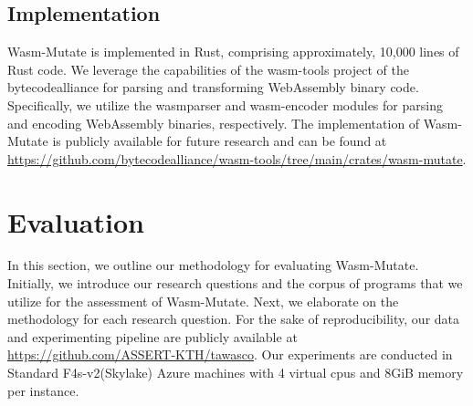\documentclass[a4paper,fleqn]{cas-dc}
\newcommand{\tool}{{\sc Wasm-Mutate}\xspace}
\newcommand{\Wasm}{WebAssembly\xspace}
\newcommand{\repourl}{\url{https://github.com/bytecodealliance/wasm-tools/tree/main/crates/wasm-mutate}}
\newcommand{\dataurl}{\url{https://github.com/ASSERT-KTH/tawasco}}
\begin{document}
\subsection{Implementation}

\tool is implemented in Rust, comprising approximately, 10,000 lines of Rust code. 
We leverage the capabilities of the wasm-tools project of the bytecodealliance for parsing and transforming WebAssembly binary code. 
Specifically, we utilize the wasmparser and wasm-encoder modules for parsing and encoding WebAssembly binaries, respectively.
The implementation of \tool is publicly available for future research and can be found at \repourl.





\section {Evaluation}
\label{eval}

In this section, we outline our methodology for evaluating \tool.
Initially, we introduce our research questions and the corpus of programs that we utilize for the assessment of \tool.
Next, we elaborate on the methodology for each research question.
For the sake of reproducibility, our data and experimenting pipeline are publicly available at \dataurl.
Our experiments are conducted in Standard F4s-v2(Skylake) Azure machines with 4 virtual cpus and 8GiB memory per instance.


\newcommand\rqstatic{To what extent are the program variants generated by \tool statically different from the original programs?\xspace}

\newcommand\rqdynamic{How fast can \tool generate program variants that exhibit different execution traces?\xspace}

\newcommand\rqdefensive{To what extent does \tool prevent side-channel attacks on \Wasm programs?\xspace}


\newcommand\rqperformance{To what extent does \tool affect the performance of real-world \Wasm program variants?\xspace}


\newcommand\rqtesting{To what extent can \tool be used to perform differential testing of \Wasm tools?\xspace}
\end{document}
